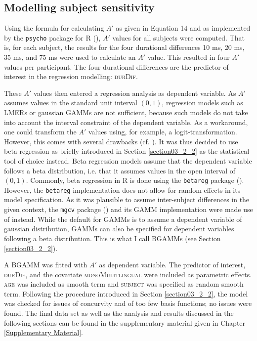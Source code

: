 \subsection{Modelling subject sensitivity}\label{section06_2_3}

Using the formula for calculating $A'$ as given in Equation 14 and as implemented by the \texttt{psycho} package for R (\cite{Makowski2018}), $A'$ values for all subjects were computed. That is, for each subject, the results for the four durational differences 10 ms, 20 ms, 35 ms, and 75 ms were used to calculate an $A'$ value. This resulted in four $A'$ values per participant. The four durational differences are the predictor of interest in the regression modelling: \textsc{durDif}.

These $A'$ values then entered a regression analysis as dependent variable. As $A'$ assumes values in the standard unit interval $(0,1)$, regression models such as LMERs or gaussian GAMMs are not sufficient, because such models do not take into account the interval constraint of the dependent variable. As a workaround, one could transform the $A'$ values using, for example, a logit-transformation. However, this comes with several drawbacks (cf. \cite{Cribari2010}). It was thus decided to use beta regression as briefly introduced in Section \ref{section03_2_2} as the statistical tool of choice instead. Beta regression models assume that the dependent variable follows a beta distribution, i.e. that it assumes values in the open interval of $(0,1)$. Commonly, beta regression in R is done using the \texttt{betareg} package (\cite{Cribari2010}). However, the \texttt{betareg} implementation does not allow for random effects in its model specification. As it was plausible to assume inter-subject differences in the given context, the \texttt{mgcv} package (\cite{Wood2017}) and its GAMM implementation were made use of instead. While the default for GAMMs is to assume a dependent variable of gaussian distribution, GAMMs can also be specified for dependent variables following a beta distribution. This is what I call BGAMMs (see Section \ref{section03_2_2}).

A BGAMM was fitted with $A'$ as dependent variable. The predictor of interest, \textsc{durDif}, and the covariate \textsc{monoMulitlingual} were included as parametric effects. \textsc{age} was included as smooth term and \textsc{subject} was specified as random smooth term. Following the procedure introduced in Section \ref{section03_2_2}, the model was checked for issues of concurvity and of too few basis functions; no issues were found. The final data set as well as the analysis and results discussed in the following sections can be found in the supplementary material given in Chapter \ref{Supplementary Material}.

